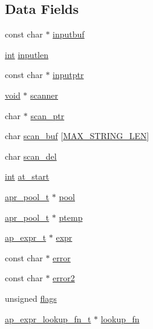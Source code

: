 \subsection*{Data Fields}
\begin{DoxyCompactItemize}
\item 
const char $\ast$ \hyperlink{structap__expr__parse__ctx__t_a9705798f66a9636a338297cde723deaa}{inputbuf}
\item 
\hyperlink{pcre_8txt_a42dfa4ff673c82d8efe7144098fbc198}{int} \hyperlink{structap__expr__parse__ctx__t_a1bfcb8ebd0b6a153795060c7a9fc46f0}{inputlen}
\item 
const char $\ast$ \hyperlink{structap__expr__parse__ctx__t_aa45cbb208184c88a5d84869e42518d9d}{inputptr}
\item 
\hyperlink{group__MOD__ISAPI_gacd6cdbf73df3d9eed42fa493d9b621a6}{void} $\ast$ \hyperlink{structap__expr__parse__ctx__t_a9974c44bc1bb6a13436f31444a1a0495}{scanner}
\item 
char $\ast$ \hyperlink{structap__expr__parse__ctx__t_a23bbb1f7ac81b894d419dec020ea789a}{scan\+\_\+ptr}
\item 
char \hyperlink{structap__expr__parse__ctx__t_a79a7db739f39f16c1f3aedb88d387045}{scan\+\_\+buf} \mbox{[}\hyperlink{passwd__common_8h_a4fa9aad0e9c7cc2e344b679cdbb2b67d}{M\+A\+X\+\_\+\+S\+T\+R\+I\+N\+G\+\_\+\+L\+EN}\mbox{]}
\item 
char \hyperlink{structap__expr__parse__ctx__t_a8a5ae8fff5447c3c376d642009a2fcfd}{scan\+\_\+del}
\item 
\hyperlink{pcre_8txt_a42dfa4ff673c82d8efe7144098fbc198}{int} \hyperlink{structap__expr__parse__ctx__t_aa1df69e2e8e8b003cd76b2fc8d4d1369}{at\+\_\+start}
\item 
\hyperlink{structapr__pool__t}{apr\+\_\+pool\+\_\+t} $\ast$ \hyperlink{structap__expr__parse__ctx__t_a9fe30cceb119563c98dcaf9965a87ed0}{pool}
\item 
\hyperlink{structapr__pool__t}{apr\+\_\+pool\+\_\+t} $\ast$ \hyperlink{structap__expr__parse__ctx__t_a5805d4262ee0fab788b30fdc2fc00abd}{ptemp}
\item 
\hyperlink{group__AP__EXPR_ga1495a85c3a89e64cf625dfe1a5905fcb}{ap\+\_\+expr\+\_\+t} $\ast$ \hyperlink{structap__expr__parse__ctx__t_aac520d55a16e8550ce336e5b3d984360}{expr}
\item 
const char $\ast$ \hyperlink{structap__expr__parse__ctx__t_a9b0e30027268bb266dced2e9eb202813}{error}
\item 
const char $\ast$ \hyperlink{structap__expr__parse__ctx__t_aa02aaa8bf460b987faa3047e37bc4f90}{error2}
\item 
unsigned \hyperlink{structap__expr__parse__ctx__t_a547d49449507e7a5bcda9bc3939ea435}{flags}
\item 
\hyperlink{group__AP__EXPR_gad1cddcb03e188322dedbc6021e12f7ea}{ap\+\_\+expr\+\_\+lookup\+\_\+fn\+\_\+t} $\ast$ \hyperlink{structap__expr__parse__ctx__t_a0f99ee98c77cd93d3c1c586f427edb12}{lookup\+\_\+fn}
\end{DoxyCompactItemize}


